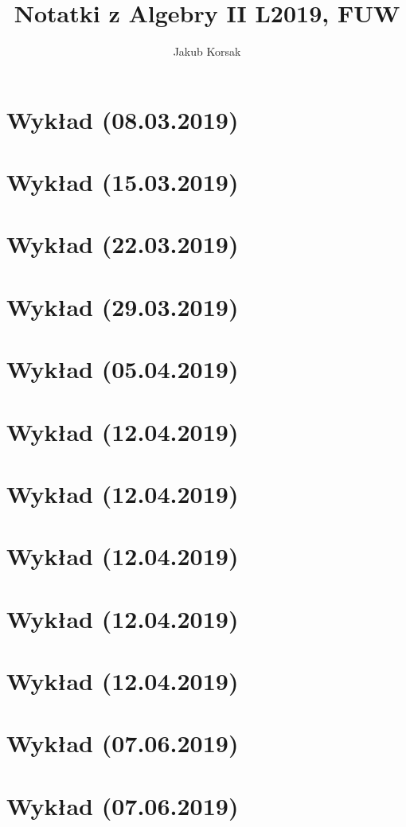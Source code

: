 \documentclass{article}
\title{Notatki z Algebry II L2019, FUW}
\author{Jakub Korsak}
\begin{document}
\maketitle

\pagebreak
\section{Wykład (08.03.2019)}

\pagebreak
\section{Wykład (15.03.2019)}

\pagebreak
\section{Wykład (22.03.2019)}

\pagebreak
\section{Wykład (29.03.2019)}

\pagebreak
\section{Wykład (05.04.2019)}

\pagebreak
\section{Wykład (12.04.2019)}

\pagebreak
\section{Wykład (12.04.2019)}

\pagebreak
\section{Wykład (12.04.2019)}

\pagebreak
\section{Wykład (12.04.2019)}

\pagebreak
%   
\section{Wykład (12.04.2019)}

\pagebreak
\section{Wykład (07.06.2019)}

\pagebreak
\section{Wykład (07.06.2019)}

\end{document}
